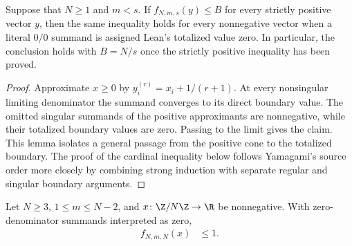 \begin{lemma}
    \label{lem:yamagami_conditional_totalized_boundary}
    \leanok
    Suppose that $N\ge1$ and $m<s$.  If $f_{N,m,s}(y)\le B$ for every
    strictly positive vector $y$, then the same inequality holds for every
    nonnegative vector when a literal $0/0$ summand is assigned Lean's
    totalized value zero.  In particular, the conclusion holds with $B=N/s$
    once the strictly positive inequality has been proved.
\end{lemma}

\begin{proof}
    \leanok
    Approximate $x\ge0$ by
    $y_i^{(r)}=x_i+1/(r+1)$.  At every nonsingular limiting denominator the
    summand converges to its direct boundary value.  The omitted singular
    summands of the positive approximants are nonnegative, while their
    totalized boundary values are zero.  Passing to the limit gives the
    claim. This lemma isolates a general passage from the positive cone to
    the totalized boundary. The proof of the cardinal inequality below follows
    Yamagami's source order more closely by combining strong induction with
    separate regular and singular boundary arguments.
\end{proof}

\begin{theorem}
    \label{thm:yamagami_cardinal_cyclic}
    \leanok
    Let $N\ge3$, $1\le m\le N-2$, and
    $x\colon\Z/N\Z\to\R$ be nonnegative. With zero-denominator summands
    interpreted as zero,
    \begin{align}
        f_{N,m,N}(x)&\le1.
        \label{eq:yamagami_cardinal_cyclic}
    \end{align}
\end{theorem}

